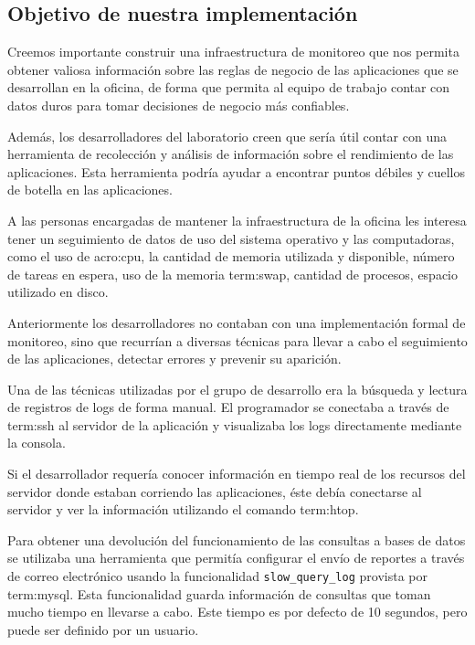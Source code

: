 \subsection{Objetivo de nuestra implementación}
\label{objetivos_de_nuestra_implementacion}

Creemos importante construir una infraestructura de monitoreo que nos permita
obtener valiosa información sobre las reglas de negocio de las aplicaciones que
se desarrollan en la oficina, de forma que permita al equipo de trabajo contar
con datos duros para tomar decisiones de negocio más confiables.

Además, los desarrolladores del laboratorio creen que sería útil contar con una
herramienta de recolección y análisis de información sobre el rendimiento de
las aplicaciones. Esta herramienta podría ayudar a encontrar puntos débiles y
cuellos de botella en las aplicaciones.

A las personas encargadas de mantener la infraestructura de la oficina les
interesa tener un seguimiento de datos de uso del sistema operativo y las
computadoras, como el uso de \gls{acro:cpu}, la cantidad de memoria utilizada y
disponible, número de tareas en espera, uso de la memoria \gls{term:swap},
cantidad de procesos, espacio utilizado en disco.

Anteriormente los desarrolladores no contaban con una implementación formal de
monitoreo, sino que recurrían a diversas técnicas para llevar a cabo el
seguimiento de las aplicaciones, detectar errores y prevenir su aparición.

Una de las técnicas utilizadas por el grupo de desarrollo era la búsqueda y
lectura de registros de logs de forma manual. El programador se conectaba a
través de \gls{term:ssh} al servidor de la aplicación y visualizaba los logs
directamente mediante la consola.

Si el desarrollador requería conocer información en tiempo real de los recursos
del servidor donde estaban corriendo las aplicaciones, éste debía conectarse al
servidor y ver la información utilizando el comando \gls{term:htop}.

Para obtener una devolución del funcionamiento de las consultas a bases de
datos se utilizaba una herramienta que permitía configurar el envío de reportes
a través de correo electrónico usando la funcionalidad
\texttt{slow\_query\_log} provista por \gls{term:mysql}. Esta funcionalidad
guarda información de consultas que toman mucho tiempo en llevarse a cabo. Este
tiempo es por defecto de 10 segundos, pero puede ser definido por un usuario.

